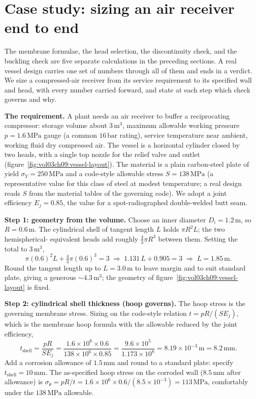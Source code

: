 \section{Case study: sizing an air receiver end to end}

The membrane formulae, the head selection, the discontinuity check, and
the buckling check are five separate calculations in the preceding
sections. A real vessel design carries one set of numbers through all of
them and ends in a verdict. We size a compressed-air receiver from its
service requirement to its specified wall and head, with every number
carried forward, and state at each step which check governs and why.

\textbf{The requirement.} A plant needs an air receiver to buffer a
reciprocating compressor: storage volume about $3\,\text{m}^3$, maximum
allowable working pressure $p = 1.6\,\text{MPa}$ gauge (a common
$16\,\text{bar}$ rating), service temperature near ambient, working
fluid dry compressed air. The vessel is a horizontal cylinder closed by
two heads, with a single top nozzle for the relief valve and outlet
(figure~\ref{fig:vol03ch09:vessel-layout}). The material is a plain
carbon-steel plate of yield $\sigma_Y = 250\,\text{MPa}$ and a
code-style allowable stress $S = 138\,\text{MPa}$ (a representative
value for this class of steel at modest temperature; a real design
reads $S$ from the material tables of the governing code). We adopt a
joint efficiency $E_j = 0.85$, the value for a spot-radiographed
double-welded butt seam.



\textbf{Step 1: geometry from the volume.} Choose an inner diameter
$D_i = 1.2\,\si{\meter}$, so $R = 0.6\,\si{\meter}$. The cylindrical
shell of tangent length $L$ holds $\pi R^2 L$; the two hemispherical-
equivalent heads add roughly $\tfrac{4}{3}\pi R^3$ between them. Setting
the total to $3\,\text{m}^3$,
\[
\pi (0.6)^2 L + \tfrac{4}{3}\pi (0.6)^3 = 3
\;\Rightarrow\;
1.131\,L + 0.905 = 3
\;\Rightarrow\;
L = 1.85\,\si{\meter}.
\]
Round the tangent length up to $L = 3.0\,\si{\meter}$ to leave margin
and to suit standard plate, giving a generous $\sim 4.3\,\text{m}^3$;
the geometry of figure~\ref{fig:vol03ch09:vessel-layout} is fixed.

\textbf{Step 2: cylindrical shell thickness (hoop governs).} The hoop
stress is the governing membrane stress. Sizing on the code-style
relation $t = pR/(S E_j)$, which is the membrane hoop formula with the
allowable reduced by the joint efficiency,
\[
t_{\text{shell}} = \frac{p R}{S E_j}
= \frac{1.6\times 10^6\times 0.6}{138\times 10^6\times 0.85}
= \frac{9.6\times 10^5}{1.173\times 10^8}
= 8.19\times 10^{-3}\,\text{m}
= 8.2\,\si{\milli\meter}.
\]
Add a corrosion allowance of $1.5\,\si{\milli\meter}$ and round to a
standard plate: specify $t_{\text{shell}} = 10\,\si{\milli\meter}$. The
as-specified hoop stress on the corroded wall ($8.5\,\si{\milli\meter}$
after allowance) is $\sigma_\theta = pR/t = 1.6\times 10^6\times 0.6/
(8.5\times 10^{-3}) = 113\,\text{MPa}$, comfortably under the
$138\,\text{MPa}$ allowable.

